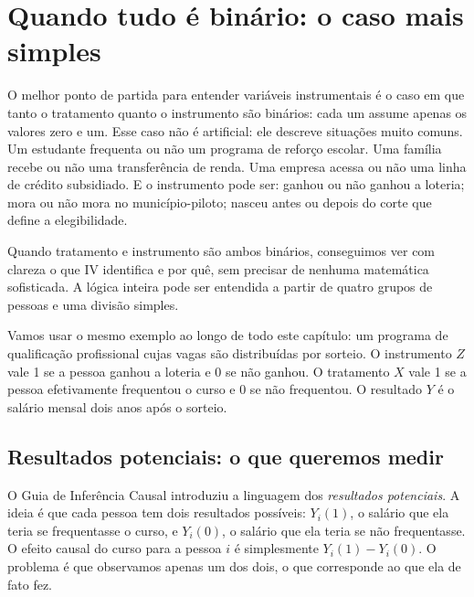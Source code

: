 
\chapter{Quando tudo é binário: o caso mais simples}
\label{cap:iv_binario}

O melhor ponto de partida para entender variáveis instrumentais é o caso em que tanto o tratamento quanto o instrumento são binários: cada um assume apenas os valores zero e um. Esse caso não é artificial: ele descreve situações muito comuns. Um estudante frequenta ou não um programa de reforço escolar. Uma família recebe ou não uma transferência de renda. Uma empresa acessa ou não uma linha de crédito subsidiado. E o instrumento pode ser: ganhou ou não ganhou a loteria; mora ou não mora no município-piloto; nasceu antes ou depois do corte que define a elegibilidade.

Quando tratamento e instrumento são ambos binários, conseguimos ver com clareza o que IV identifica e por quê, sem precisar de nenhuma matemática sofisticada. A lógica inteira pode ser entendida a partir de quatro grupos de pessoas e uma divisão simples.

Vamos usar o mesmo exemplo ao longo de todo este capítulo: um programa de qualificação profissional cujas vagas são distribuídas por sorteio. O instrumento $Z$ vale 1 se a pessoa ganhou a loteria e 0 se não ganhou. O tratamento $X$ vale 1 se a pessoa efetivamente frequentou o curso e 0 se não frequentou. O resultado $Y$ é o salário mensal dois anos após o sorteio.

\section{Resultados potenciais: o que queremos medir}
\label{sec:potenciais_binario}

O Guia de Inferência Causal introduziu a linguagem dos \textit{resultados potenciais}. A ideia é que cada pessoa tem dois resultados possíveis: $Y_i(1)$, o salário que ela teria se frequentasse o curso, e $Y_i(0)$, o salário que ela teria se não frequentasse. O efeito causal do curso para a pessoa $i$ é simplesmente $Y_i(1) - Y_i(0)$. O problema é que observamos apenas um dos dois, o que corresponde ao que ela de fato fez.

